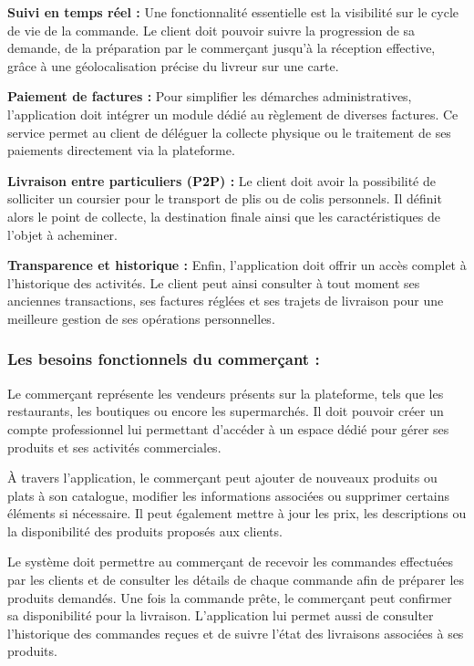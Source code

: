 \documentclass[12pt,fleqn,a4paper]{report}
\begin{document}
\begin{justify}
\vspace{0.4cm}
\textbf{Suivi en temps réel :} Une fonctionnalité essentielle est la visibilité sur le cycle de vie de la commande. Le client doit pouvoir suivre la progression de sa demande, de la préparation par le commerçant jusqu'à la réception effective, grâce à une géolocalisation précise du livreur sur une carte.

\vspace{0.4cm}
\textbf{Paiement de factures :} Pour simplifier les démarches administratives, l'application doit intégrer un module dédié au règlement de diverses factures. Ce service permet au client de déléguer la collecte physique ou le traitement de ses paiements directement via la plateforme.

\vspace{0.4cm}
\textbf{Livraison entre particuliers (P2P) :} Le client doit avoir la possibilité de solliciter un coursier pour le transport de plis ou de colis personnels. Il définit alors le point de collecte, la destination finale ainsi que les caractéristiques de l'objet à acheminer.

\vspace{0.4cm}
\textbf{Transparence et historique :} Enfin, l'application doit offrir un accès complet à l'historique des activités. Le client peut ainsi consulter à tout moment ses anciennes transactions, ses factures réglées et ses trajets de livraison pour une meilleure gestion de ses opérations personnelles.

\newpage
\subsubsection{Les besoins fonctionnels du commerçant :}
Le commerçant représente les vendeurs présents sur la plateforme, tels que les restaurants, les boutiques ou encore les supermarchés. Il doit pouvoir créer un compte professionnel lui permettant d'accéder à un espace dédié pour gérer ses produits et ses activités commerciales.

À travers l'application, le commerçant peut ajouter de nouveaux produits ou plats à son catalogue, modifier les informations associées ou supprimer certains éléments si nécessaire. Il peut également mettre à jour les prix, les descriptions ou la disponibilité des produits proposés aux clients.

Le système doit permettre au commerçant de recevoir les commandes effectuées par les clients et de consulter les détails de chaque commande afin de préparer les produits demandés. Une fois la commande prête, le commerçant peut confirmer sa disponibilité pour la livraison. L'application lui permet aussi de consulter l'historique des commandes reçues et de suivre l'état des livraisons associées à ses produits.


\end{justify}
\end{document}
